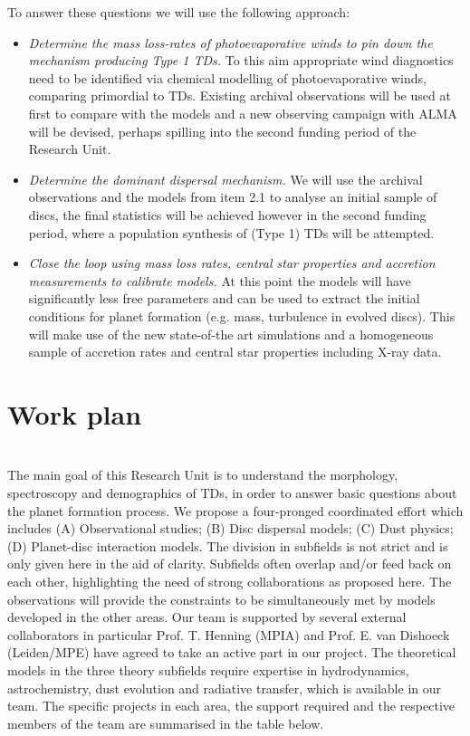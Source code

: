 \documentclass[12pt]{article}
\begin{document}
To answer these questions we will use the following approach: 

\begin{itemize}
\item{\it Determine the mass loss-rates of photoevaporative winds
  to pin down the mechanism producing Type 1 TDs.} To
this aim appropriate wind diagnostics need to be identified via
chemical modelling of  photoevaporative winds, comparing primordial to
TDs. Existing archival observations will be used at first to compare
with the models and a new observing campaign with ALMA will be
devised, perhaps spilling into the second funding period of the Research Unit.
\item{\it Determine the dominant dispersal mechanism.} We will
use the archival observations and the models from item 2.1 to analyse
an initial sample of discs, the final statistics will be achieved
however in the second funding period, where a population synthesis of
(Type 1) TDs will be attempted.
\item {\it Close the loop using mass loss rates, central star
  properties and accretion measurements to calibrate models.}  At this
point the models will have significantly less free parameters and can
be used to extract the initial conditions for planet formation
(e.g. mass, turbulence in evolved discs). This will make use of the new state-of-the
art simulations and a homogeneous sample of accretion rates and central
star properties including X-ray data. 
\end{itemize}

\section*{Work plan}

\vspace{0.8em}\\
%
The main goal of this Research Unit is to understand the morphology,
spectroscopy and demographics of TDs, in order to answer
basic questions about the planet formation process. We propose a
four-pronged coordinated effort which includes (A) Observational
studies; (B) Disc dispersal models; (C) Dust physics; (D) Planet-disc
interaction models. The division in subfields is not strict and is
only given here in the aid of clarity. Subfields often overlap and/or
feed back on each other, highlighting the need of strong
collaborations as proposed here. The observations will provide the
constraints to be simultaneously met by models developed in the other
areas. Our team is supported by several external collaborators in particular
Prof. T. Henning (MPIA) and Prof. E. van Dishoeck (Leiden/MPE) have
agreed to take an active part in our project. The theoretical models in the three theory subfields require
expertise in hydrodynamics, astrochemistry, dust evolution and
radiative transfer, which is available in our team. The specific
projects in each area, the support required and the respective members
of the team are summarised in the table below. 
\vspace{1.5em}
\end{document}
